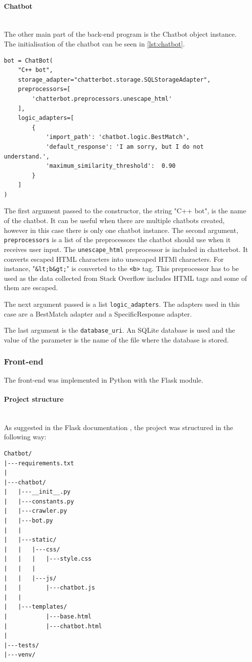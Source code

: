 \documentclass[12pt,a4paper]{article}
\newcommand{\myparagraph}[1]{\paragraph{#1}\mbox{}\\}
\newcommand{\captionstyle}[1] {
    \small{\textit{#1}}
}
\begin{document}
\myparagraph{Chatbot}
The other main part of the back-end program is the Chatbot object instance. The initialisation of the chatbot can be seen in \cref{lst:chatbot}.

\begin{lstlisting}[caption={\captionstyle{Initialisation of the Chatbot object.}}, label={lst:chatbot}]
bot = ChatBot(
    "C++ bot",
    storage_adapter="chatterbot.storage.SQLStorageAdapter",
    preprocessors=[
        'chatterbot.preprocessors.unescape_html'
    ],
    logic_adapters=[
        {
            'import_path': 'chatbot.logic.BestMatch',
            'default_response': 'I am sorry, but I do not understand.',
            'maximum_similarity_threshold':  0.90
        }
    ]
)
\end{lstlisting}

The first argument passed to the constructor, the string "C++ bot", is the name of the chatbot. It can be useful when there are multiple chatbots created, however in this case there is only one chatbot instance. The second argument, \texttt{preprocessors} is a list of the preprocessors the chatbot should use when it receives user input. The \texttt{unescape\_html} preprocessor is included in chatterbot. It converts escaped HTML characters into unescaped HTMl characters. For instance, "\texttt{\&lt;b\&gt;}" is converted to the \texttt{<b>} tag. This preprocessor has to be used as the data collected from Stack Overflow includes HTML tags and some of them are escaped.

The next argument passed is a list \texttt{logic\_adapters}. The adapters used in this case are a BestMatch adapter and a SpecificResponse adapter.

The last argument is the \texttt{database\_uri}. An SQLite database is used and the value of the parameter is the name of the file where the database is stored.


\subsubsection{Front-end}
The front-end was implemented in Python with the Flask module.

\myparagraph{Project structure}
As suggested in the Flask documentation \cite{Flask:online}, the project was structured in the following way: 
\begin{verbatim}
Chatbot/
|---requirements.txt
|   
|---chatbot/
|   |---__init__.py
|   |---constants.py
|   |---crawler.py
|   |---bot.py
|   |   
|   |---static/
|   |   |---css/
|   |   |   |---style.css
|   |   |       
|   |   |---js/
|   |       |---chatbot.js
|   |           
|   |---templates/
|           |---base.html
|           |---chatbot.html
|           
|---tests/
|---venv/    
\end{verbatim}
\end{document}
